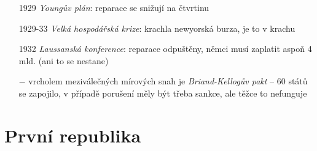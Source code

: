\documentclass{article}
\begin{document}
\begin{itemize}
  \item[1929] \textit{Youngův plán}: reparace se snižují na čtvrtinu
  \item[1929-33] \textit{Velká hospodářská krize}: krachla newyorská burza, je to v krachu
  \item[1932] \textit{Laussanská konference}: reparace odpuštěny, němci musí zaplatit aspoň 4 mld. (ani to se nestane)
  \item[$-$] vrcholem meziválečných mírových snah je \textit{Briand-Kellogův pakt}  -- 60 států se zapojilo, v případě porušení měly být třeba sankce, ale těžce to nefunguje
\end{itemize}


\section*{První republika}
\end{document}

